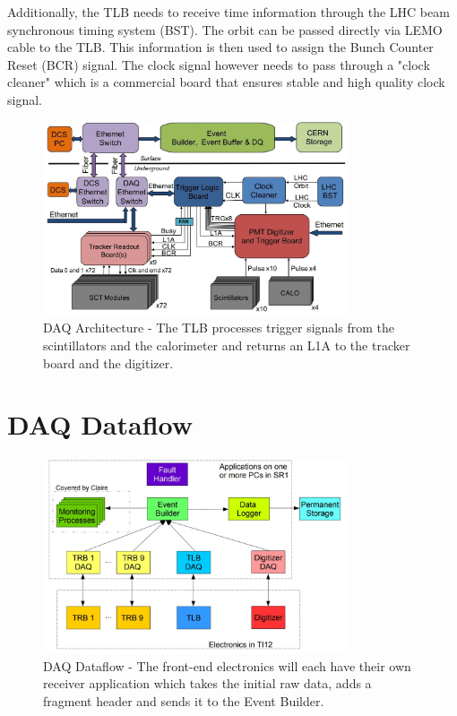 Additionally, the TLB needs to receive time information through the LHC beam synchronous timing system (BST). The orbit can be passed directly via LEMO cable to the TLB. This information is then used to assign the Bunch Counter Reset (BCR) signal. The clock signal however needs to pass through a "clock cleaner" which is a commercial board that ensures stable and high quality clock signal.

\begin{figure}[htbp!] 
\centering    
\includegraphics[width=0.8\textwidth]{ChapterDAQ/Figs/GeneralDAQ/Architecture.jpg}
\caption[DAQ Architecture]{DAQ Architecture - The TLB processes trigger signals from the scintillators and the calorimeter and returns an L1A to the tracker board and the digitizer.}
\label{fig:DAQArchitecture}
\end{figure}


\section{DAQ Dataflow}


\begin{figure}[htbp!] 
\centering    
\includegraphics[width=0.8\textwidth]{ChapterDAQ/Figs/GeneralDAQ/DAQDataFlow.jpg}
\caption[DAQ Dataflow]{DAQ Dataflow - The front-end electronics will each have their own receiver application which takes the initial raw data, adds a fragment header and sends it to the Event Builder.}
\label{fig:DAQDataFlow}
\end{figure}


